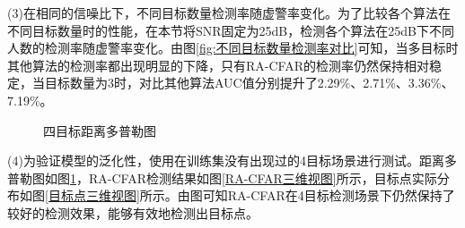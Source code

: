 (3)在相同的信噪比下，不同目标数量检测率随虚警率变化。为了比较各个算法在不同目标数量时的性能，在本节将SNR固定为25dB，检测各个算法在25dB下不同人数的检测率随虚警率变化。由图\ref{fig:不同目标数量检测率对比}可知，当多目标时其他算法的检测率都出现明显的下降，只有RA-CFAR的检测率仍然保持相对稳定，当目标数量为3时，对比其他算法AUC值分别提升了2.29\%、2.71\%、3.36\%、7.19\%。

\begin{figure}[htbp]
	\centering
	\caption{四目标距离多普勒图}
	\label{fig:四目标距离多普勒图}
\end{figure}

(4)为验证模型的泛化性，使用在训练集没有出现过的4目标场景进行测试。距离多普勒图如图\ref{fig:四目标距离多普勒图}，RA-CFAR检测结果如图\ref{RA-CFAR三维视图}所示，目标点实际分布如图\ref{目标点三维视图}所示。由图可知RA-CFAR在4目标检测场景下仍然保持了较好的检测效果，能够有效地检测出目标点。


